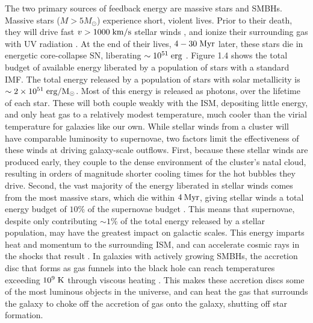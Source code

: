 The two primary sources of feedback energy are massive stars and SMBHs.  Massive
stars ($M>5M_\odot$) experience short, violent lives.  Prior to their death,
they will drive fast $v>1000\;\rm{km/s}$ stellar winds \citep{Weaver1977}, and
ionize their surrounding gas with UV radiation \citep{Krumholz2009}.  At the end
of their lives, $4-30\;\rm{Myr}$ later, these stars die in energetic
core-collapse SN, liberating $\sim10^{51}\;\rm{erg}$
\citep{Wilson1985,Bethe1990}.  Figure 1.4 shows the total budget of available
energy liberated by a population of stars with a standard \citet{Chabrier2003}
IMF.  The total energy released by a population of stars with solar metallicity is
$\sim 2\times10^{51}\;\rm{erg/M_\odot}$.  Most of this energy is released as
photons, over the lifetime of each star.  These will both couple weakly with the
ISM, depositing little energy, and only heat gas to a relatively modest
temperature, much cooler than the virial temperature for galaxies like our own.
While stellar winds from a cluster will have comparable luminosity to
supernovae, two factors limit the effectiveness of these winds at driving
galaxy-scale outflows.  First, because these stellar winds are produced early,
they couple to the dense environment of the cluster's natal cloud, resulting in
orders of magnitude shorter cooling times for the hot bubbles they drive.
Second, the vast majority of the energy liberated in stellar winds comes from
the most massive stars, which die within $4\>{\rm Myr}$, giving stellar winds a total
energy budget of $10\%$ of the supernovae budget \citet{Leitherer1999}.
This means that supernovae, despite only contributing $\sim1\%$ of the total
energy released by a stellar population, may have the greatest impact on
galactic scales.  This energy imparts heat and momentum to the surrounding ISM,
and can accelerate cosmic rays in the shocks that result \citep{Bell1978}.  In
galaxies with actively growing SMBHs, the accretion disc that forms as gas
funnels into the black hole can reach temperatures exceeding $10^9\;\rm{K}$
through viscous heating \citep{Antonucci1993}.  This makes these accretion discs
some of the most luminous objects in the universe, and can heat the gas that
surrounds the galaxy to choke off the accretion of gas onto the galaxy, shutting
off star formation.

